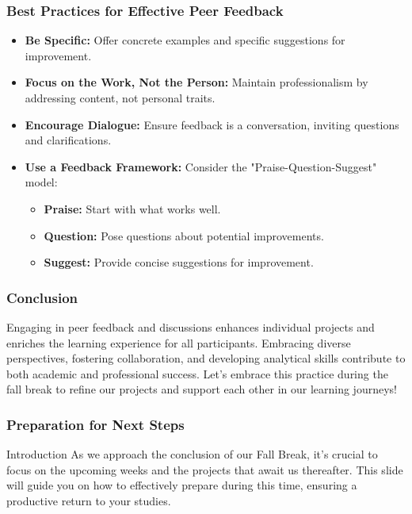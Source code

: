 \documentclass[aspectratio=169]{beamer}
\begin{document}
\begin{frame}[fragile]
    \frametitle{Best Practices for Effective Peer Feedback}
    \begin{itemize}
        \item \textbf{Be Specific:} Offer concrete examples and specific suggestions for improvement.
        \item \textbf{Focus on the Work, Not the Person:} Maintain professionalism by addressing content, not personal traits.
        \item \textbf{Encourage Dialogue:} Ensure feedback is a conversation, inviting questions and clarifications.
        \item \textbf{Use a Feedback Framework:} Consider the "Praise-Question-Suggest" model:
        \begin{itemize}
            \item \textbf{Praise:} Start with what works well.
            \item \textbf{Question:} Pose questions about potential improvements.
            \item \textbf{Suggest:} Provide concise suggestions for improvement.
        \end{itemize}
    \end{itemize}
\end{frame}

\begin{frame}[fragile]
    \frametitle{Conclusion}
    Engaging in peer feedback and discussions enhances individual projects and enriches the learning experience for all participants. Embracing diverse perspectives, fostering collaboration, and developing analytical skills contribute to both academic and professional success. Let’s embrace this practice during the fall break to refine our projects and support each other in our learning journeys!
\end{frame}

\begin{frame}[fragile]
    \frametitle{Preparation for Next Steps}
    \begin{block}{Introduction}
        As we approach the conclusion of our Fall Break, it's crucial to focus on the upcoming weeks and the projects that await us thereafter. This slide will guide you on how to effectively prepare during this time, ensuring a productive return to your studies.
    \end{block}
\end{frame}
\end{document}
